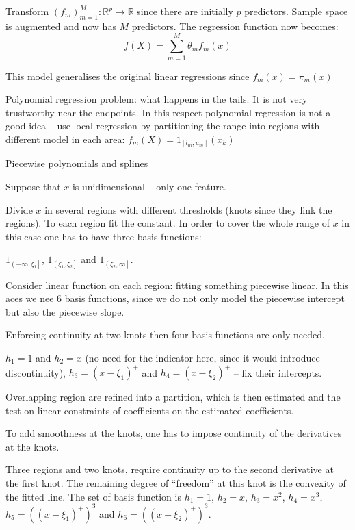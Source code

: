 \documentclass[a4paper]{article}
\newcommand{\clo}[1]{{\left [ #1 \right ]}}
\newcommand{\ploc}[1]{{\left ( #1 \right ]}}
\newcommand{\brac}[1]{{\left ( #1 \right )}}
\newcommand{\Real}{\mathbb{R}}
\begin{document}
Transform $\brac{f_m}_{m=1}^M:\Real^p \to \Real$ since there are initially $p$ predictors.
Sample space is augmented and now has $M$ predictors. The regression function now becomes:
\[f(X) = \sum_{m=1}^M \theta_m f_m(x)\]

This model generalises the original linear regressions since $f_m(x) = \pi_m(x)$ 

Polynomial regression problem: what happens in the tails. It is not very trustworthy near the endpoints.
In this respect polynomial regression is not a good idea -- use local regression by partitioning the range
into regions with different model in each area: $f_m(X) = 1_{\clo{l_m, u_m}}(x_k)$

Piecewise polynomials and splines

Suppose that $x$ is unidimensional -- only one feature.

Divide $x$ in several regions with different thresholds (knots since they link the regions).
To each region fit the constant. In order to cover the whole range of $x$ in this case one has to have three basis functions:

$1_{\ploc{-\infty, \xi_1}}$, $1_{\ploc{\xi_1, \xi_2}}$ and $1_{\ploc{\xi_2, \infty}}$.

Consider linear function on each region: fitting something piecewise linear. In this aces we nee 6 basis functions, since we do not only model the piecewise intercept but also the piecewise slope.

Enforcing continuity at two knots then four basis functions are only needed.

$h_1 = 1$ and $h_2 = x$ (no need for the indicator here, since it would introduce discontinuity), $h_3 = \brac{x-\xi_1}^+$ and $h_4 = \brac{x-\xi_2}^+$ -- fix their intercepts.

Overlapping region are refined into a partition, which is then estimated and the test on linear constraints of coefficients on the estimated coefficients.

To add smoothness at the knots, one has to impose continuity of the derivatives at the knots.

Three regions and two knots, require continuity up to the second derivative at the first knot.
The remaining degree of ``freedom'' at this knot is the convexity of the fitted line.
The set of basis function is $h_1 = 1$, $h_2 = x$, $h_3 = x^2$, $h_4 = x^3$, $h_5 = \brac{\brac{x-\xi_1}^+}^3$ and $h_6 = \brac{\brac{x-\xi_2}^+}^3$.
\end{document}

